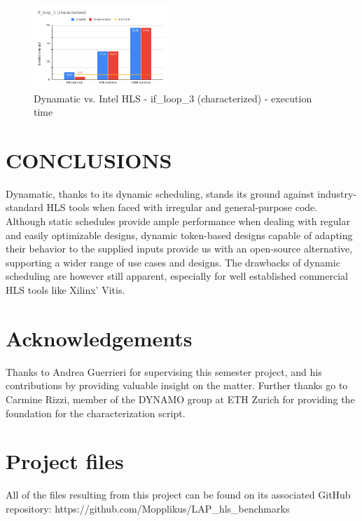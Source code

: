 \documentclass[final,5p,times,twocolumn]{elsarticle}
\begin{document}
\begin{spacing}{1.125}
\begin{figure}
	\centering 
	\includegraphics[width=0.45\textwidth]{dyn_char_runtime.png}	
	\caption{Dynamatic vs. Intel HLS - if\_loop\_3 (characterized) - execution time} 
	\label{fig_mom0}%
\end{figure}

\section{CONCLUSIONS}
Dynamatic, thanks to its dynamic scheduling, stands its ground against industry-standard HLS tools when faced with irregular and general-purpose code. Although static schedules provide ample performance when dealing with regular and easily optimizable designs, dynamic token-based designs capable of adapting their behavior to the supplied inputs provide us with an open-source alternative, supporting a wider range of use cases and designs. The drawbacks of dynamic scheduling are however still apparent, especially for well established commercial HLS tools like Xilinx' Vitis.


\section*{Acknowledgements}
Thanks to Andrea Guerrieri for supervising this semester project, and his contributions by providing valuable insight on the matter. Further thanks go to Carmine Rizzi, member of the DYNAMO group at ETH Zurich for providing the foundation for the characterization script.

\appendix
\section{Project files}
All of the files resulting from this project can be found on its associated GitHub repository:
https://github.com/Mopplikus/LAP\_hls\_benchmarks


\end{spacing}
\end{document}
